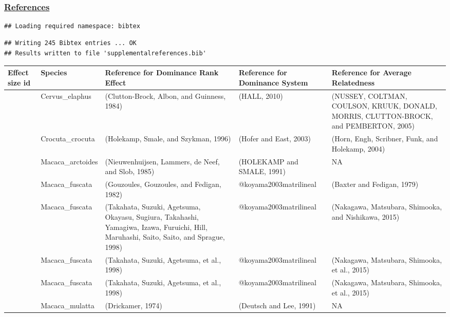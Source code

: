 \documentclass[
]{article}
\begin{document}
~

\hypertarget{references}{%
\subsubsection{\texorpdfstring{\href{MyLibrary.bib}{References}}{References}}\label{references}}

\begin{verbatim}
## Loading required namespace: bibtex
\end{verbatim}

\begin{verbatim}
## Writing 245 Bibtex entries ... OK
## Results written to file 'supplementalreferences.bib'
\end{verbatim}

\begin{tabu} to 
\hline
Effect size id & Species & Reference for Dominance Rank Effect & Reference for Dominance System & Reference for Average Relatedness\\
 & Cervus\_elaphus & (Clutton-Brock, Albon, and Guinness, 1984) & (HALL, 2010) & (NUSSEY, COLTMAN, COULSON, KRUUK, DONALD, MORRIS, CLUTTON-BROCK, and PEMBERTON, 2005)\\
 & Crocuta\_crocuta & (Holekamp, Smale, and Szykman, 1996) & (Hofer and East, 2003) & (Horn, Engh, Scribner, Funk, and Holekamp, 2004)\\
 & Macaca\_arctoides & (Nieuwenhuijsen, Lammers, de
Neef, and Slob, 1985) & (HOLEKAMP and SMALE, 1991) & NA\\
 & Macaca\_fuscata & (Gouzoules, Gouzoules, and Fedigan, 1982) & @koyama2003matrilineal & (Baxter and Fedigan, 1979)\\
 & Macaca\_fuscata & (Takahata, Suzuki, Agetsuma, Okayasu, Sugiura, Takahashi, Yamagiwa, Izawa, Furuichi, Hill, Maruhashi, Saito, Saito, and Sprague, 1998) & @koyama2003matrilineal & (Nakagawa, Matsubara, Shimooka, and Nishikawa, 2015)\\
 & Macaca\_fuscata & (Takahata, Suzuki, Agetsuma, et al., 1998) & @koyama2003matrilineal & (Nakagawa, Matsubara, Shimooka, et al., 2015)\\
 & Macaca\_fuscata & (Takahata, Suzuki, Agetsuma, et al., 1998) & @koyama2003matrilineal & (Nakagawa, Matsubara, Shimooka, et al., 2015)\\
 & Macaca\_mulatta & (Drickamer, 1974) & (Deutsch and Lee, 1991) & NA\\

\end{tabu}
\end{document}
